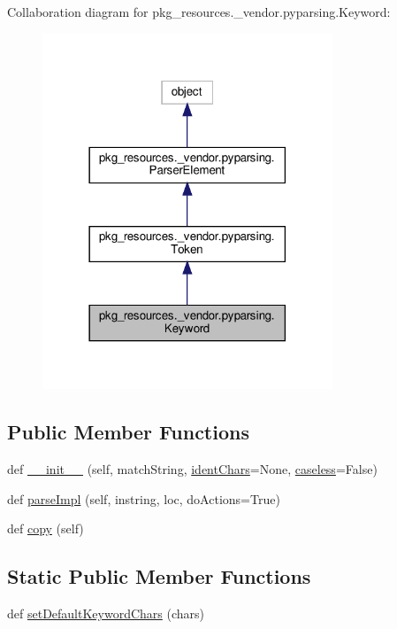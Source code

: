 Collaboration diagram for pkg\+\_\+resources.\+\_\+vendor.\+pyparsing.\+Keyword\+:
\nopagebreak
\begin{figure}[H]
\begin{center}
\leavevmode
\includegraphics[width=246pt]{classpkg__resources_1_1__vendor_1_1pyparsing_1_1Keyword__coll__graph}
\end{center}
\end{figure}
\subsection*{Public Member Functions}
\begin{DoxyCompactItemize}
\item 
def \hyperlink{classpkg__resources_1_1__vendor_1_1pyparsing_1_1Keyword_a8c3805a8d601ab8e92e2a968354b6623}{\+\_\+\+\_\+init\+\_\+\+\_\+} (self, match\+String, \hyperlink{classpkg__resources_1_1__vendor_1_1pyparsing_1_1Keyword_a7a7ddf827885e3eba8c0d9f7cb22a336}{ident\+Chars}=None, \hyperlink{classpkg__resources_1_1__vendor_1_1pyparsing_1_1Keyword_ae16052ab5cfe7e090f053d41225446f5}{caseless}=False)
\item 
def \hyperlink{classpkg__resources_1_1__vendor_1_1pyparsing_1_1Keyword_aa922abca8f0fe86fcf6698180a7ad382}{parse\+Impl} (self, instring, loc, do\+Actions=True)
\item 
def \hyperlink{classpkg__resources_1_1__vendor_1_1pyparsing_1_1Keyword_a52488aef63a7f6685d6f7f647c571fec}{copy} (self)
\end{DoxyCompactItemize}
\subsection*{Static Public Member Functions}
\begin{DoxyCompactItemize}
\item 
def \hyperlink{classpkg__resources_1_1__vendor_1_1pyparsing_1_1Keyword_aa953b4f1c49d897e4e410e04c0f2a887}{set\+Default\+Keyword\+Chars} (chars)
\end{DoxyCompactItemize}
